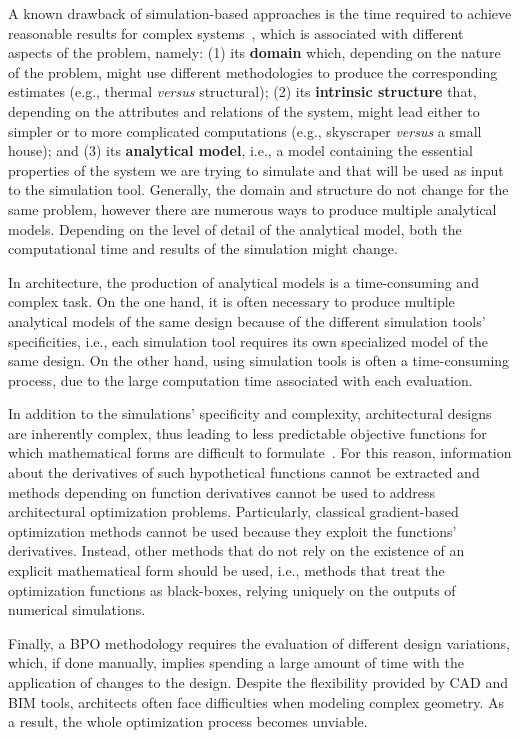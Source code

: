 	A known drawback of simulation-based approaches is the time required to achieve reasonable results for complex systems~\cite{Law1991}, which is associated with different aspects of the problem, namely: (1) its \textbf{domain} which, depending on the nature of the problem, might use different methodologies to produce the corresponding estimates (e.g., thermal \textit{versus} structural); (2) its \textbf{intrinsic structure} that, depending on the attributes and relations of the system, might lead either to simpler or to more complicated computations (e.g., skyscraper \textit{versus} a small house); and (3) its \textbf{analytical model}, i.e., a model containing the essential properties of the system we are trying to simulate and that will be used as input to the simulation tool. Generally, the domain and structure do not change for the same problem, however there are numerous ways to produce multiple analytical models. Depending on the level of detail of the analytical model, both the computational time and results of the simulation might change. 

	In architecture, the production of analytical models is a time-consuming and complex task. On the one hand, it is often necessary to produce multiple analytical models of the same design because of the different simulation tools' specificities, i.e., each simulation tool requires its own specialized model of the same design. On the other hand, using simulation tools is often a time-consuming process, due to the large computation time associated with each evaluation. 
	
	In addition to the simulations' specificity and complexity, architectural designs are inherently complex, thus leading to less predictable objective functions for which mathematical forms are difficult to formulate~\cite{Machairas2014}. For this reason, information about the derivatives of such hypothetical functions cannot be extracted and methods depending on function derivatives cannot be used to address architectural optimization problems. Particularly, classical gradient-based optimization methods cannot be used because they exploit the functions' derivatives. Instead, other methods that do not rely on the existence of an explicit mathematical form should be used, i.e., methods that treat the optimization functions as black-boxes, relying uniquely on the outputs of numerical simulations.
	
	Finally, a \ac{BPO} methodology requires the evaluation of different design variations, which, if done manually, implies spending a large amount of time with the application of changes to the design. Despite the flexibility provided by \ac{CAD} and \ac{BIM} tools, architects often face difficulties when modeling complex geometry. As a result, the whole optimization process becomes unviable.
	
